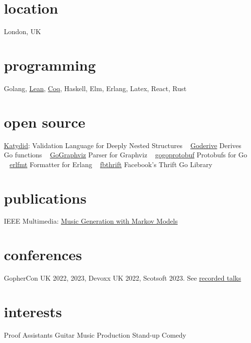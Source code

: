 \documentclass[print]{friggeri-cv-a4} %
\begin{document}

\begin{aside} %
\section{location}
London, UK
\section{programming}
Golang, \href{https://leanprover.github.io/}{Lean}, \href{https://coq.inria.fr/}{Coq}, Haskell, Elm, Erlang, Latex, React, Rust
\section{open source}
\href{https://katydid.github.io}{Katydid}:
Validation Language for Deeply Nested Structures
~
\href{https://github.com/awalterschulze/goderive}{Goderive} 
Derives Go functions
~
\href{https://github.com/awalterschulze/gographviz}{GoGraphviz} 
Parser for Graphviz
~
\href{https://github.com/gogo/protobuf}{gogoprotobuf} 
Protobufs for Go 
~
\href{https://github.com/WhatsApp/erlfmt}{erlfmt}  
Formatter for Erlang
~
\href{https://github.com/facebook/fbthrift}{fbthrift}
Facebook's Thrift Go Library
\section{publications}
IEEE Multimedia: \href{http://doi.ieeecomputersociety.org/10.1109/MMUL.2010.44}{Music Generation with Markov Models}
\section{conferences}
GopherCon UK 2022, 2023, Devoxx UK 2022, Scotsoft 2023.
See \href{https://www.youtube.com/playlist?list=PLYwF9EIrl42T3ml_ANaNifOuTQtLxaZgQ}{\faYoutubePlay recorded talks}
\section{interests}
Proof Assistants
Guitar
Music Production
Stand-up Comedy
\end{aside}
\end{document}
